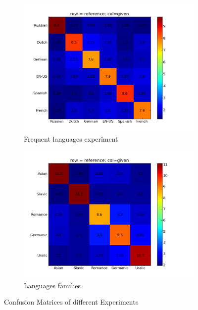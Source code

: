 \documentclass[10pt,a5paper,twoside]{article}
\begin{document}
\begin{figure}

\begin{subfigure}[]{0.5\textwidth}
\includegraphics[scale=0.4]{popular_cfm.png}
\caption{Frequent languages experiment}
\label{pop_cfm}
\end{subfigure}
\begin{subfigure}[]{0.5\textwidth}
\includegraphics[scale=0.4]{family_cfm.png}
\caption{Languages families}
\label{fam_cfm}
\end{subfigure}

\caption{Confusion Matrices of different Experiments}
\end{figure}
\end{document}
